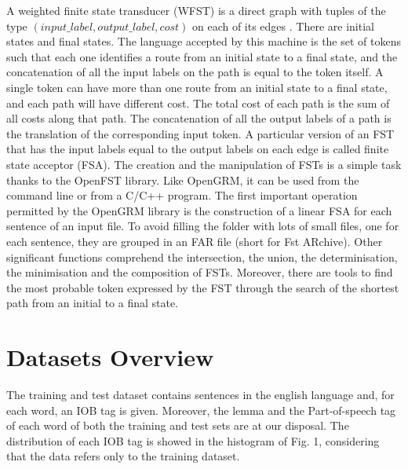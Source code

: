 \documentclass[11pt,a4paper]{article}
\begin{document}
A weighted finite state transducer (WFST) is a direct graph with tuples of the type $(input\_label, output\_label, cost)$ on each of its edges \cite{wfst}. There are initial states and final states. The language accepted by this machine is the set of tokens such that each one identifies a route from an initial state to a final state, and the concatenation of all the input labels on the path is equal to the token itself. A single token can have more than one route from an initial state to a final state, and each path will have different cost. The total cost of each path is the sum of all costs along that path. The concatenation of all the output labels of a path is the translation of the corresponding input token. A particular version of an FST that has the input labels equal to the output labels on each edge is called finite state acceptor (FSA).
The creation and the manipulation of FSTs is a simple task thanks to the OpenFST library. Like OpenGRM, it can be used from the command line or from a C/C++ program. The first important operation permitted by the OpenGRM library is the construction of a linear FSA for each sentence of an input file. To avoid filling the folder with lots of small files, one for each sentence, they are grouped in an FAR file (short for Fst ARchive). Other significant functions comprehend the intersection, the union, the determinisation, the minimisation and the composition of FSTs. Moreover, there are tools to find the most probable token expressed by the FST through the search of the shortest path from an initial to a final state.

\section{Datasets Overview}

The training and test dataset contains sentences in the english language and, for each word, an IOB tag is given. Moreover, the lemma and the Part-of-speech tag of each word of both the training and test sets are at our disposal. The distribution of each IOB tag is showed in the histogram of Fig. 1, considering that the data refers only to the training dataset.
\end{document}
